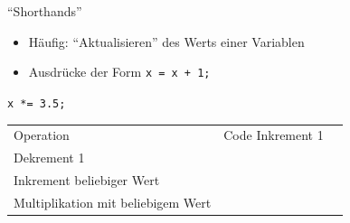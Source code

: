 \begin{frame}[fragile]{\enquote{Shorthands}}
%
\begin{itemize}
	\item Häufig: \enquote{Aktualisieren} des Werts einer Variablen
	\item Ausdrücke der Form \texttt{x = x + 1;}
\end{itemize}
%
\newsavebox{\codeShorthandInc}
%
\newsavebox{\codeShorthandDec}
%
\newsavebox{\codeShorthandManinc}
%
\newsavebox{\codeShorthandManmul}
\savebox{\codeShorthandManmul}
{\texttt{x *= 3.5;}}
%
\begin{tcolorbox}[title=Shorthands in C]
\begin{center}
\begin{table}
	\begin{tabularx}
		{\linewidth}
		{CC}
	
		Operation                          & Code \tabcrlf
		Inkrement 1                        & \usebox{\codeShorthandInc} \\
		Dekrement 1                        & \usebox{\codeShorthandDec}  \\
		Inkrement beliebiger Wert          & \usebox{\codeShorthandManinc} \\
		Multiplikation mit beliebigem Wert & \usebox{\codeShorthandManmul} \\
	\end{tabularx}
\end{table}
\end{center}
\end{tcolorbox}
%
\end{frame}


